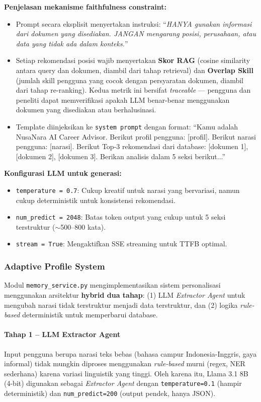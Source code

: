 \textbf{Penjelasan mekanisme faithfulness constraint:}
\begin{itemize}
  \item Prompt secara eksplisit menyertakan instruksi:
    ``\textit{HANYA gunakan informasi dari dokumen yang disediakan. JANGAN mengarang
    posisi, perusahaan, atau data yang tidak ada dalam konteks.}''
  \item Setiap rekomendasi posisi wajib menyertakan \textbf{Skor RAG} (cosine similarity
    antara query dan dokumen, diambil dari tahap retrieval) dan \textbf{Overlap Skill}
    (jumlah skill pengguna yang cocok dengan persyaratan dokumen, diambil dari
    tahap re-ranking). Kedua metrik ini bersifat \textit{traceable} --- pengguna dan
    peneliti dapat memverifikasi apakah LLM benar-benar menggunakan dokumen yang
    disediakan atau berhalusinasi.
  \item Template diinjeksikan ke \texttt{system prompt} dengan format:
    ``Kamu adalah NusaNara AI Career Advisor. Berikut profil pengguna: [profil].
    Berikut narasi pengguna: [narasi]. Berikut Top-3 rekomendasi dari database:
    [dokumen 1], [dokumen 2], [dokumen 3]. Berikan analisis dalam 5 seksi berikut...''
\end{itemize}

\textbf{Konfigurasi LLM untuk generasi:}
\begin{itemize}[noitemsep]
  \item \texttt{temperature = 0.7}: Cukup kreatif untuk narasi yang bervariasi,
    namun cukup deterministik untuk konsistensi rekomendasi.
  \item \texttt{num\_predict = 2048}: Batas token output yang cukup untuk 5 seksi
    terstruktur ($\sim$500--800 kata).
  \item \texttt{stream = True}: Mengaktifkan SSE streaming untuk TTFB optimal.
\end{itemize}

\subsubsection{Adaptive Profile System}

Modul \texttt{memory\_service.py} mengimplementasikan sistem personalisasi menggunakan
arsitektur \textbf{hybrid dua tahap}: (1) LLM \textit{Extractor Agent} untuk mengubah
narasi tidak terstruktur menjadi data terstruktur, dan (2) logika \textit{rule-based}
deterministik untuk memperbarui database.

\paragraph{Tahap 1 -- LLM Extractor Agent}
Input pengguna berupa narasi teks bebas (bahasa campur Indonesia-Inggris, gaya informal)
tidak mungkin diproses menggunakan \textit{rule-based} murni (regex, NER sederhana) karena
variasi linguistik yang tinggi. Oleh karena itu, Llama 3.1 8B (4-bit) digunakan sebagai
\textit{Extractor Agent} dengan \texttt{temperature=0.1} (hampir deterministik) dan
\texttt{num\_predict=200} (output pendek, hanya JSON).

